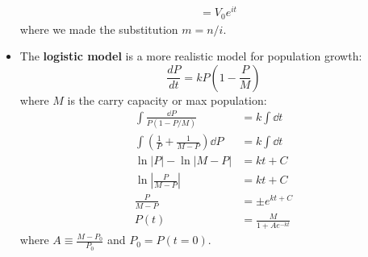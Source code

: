 \begin{itemize}
\begin{align}
        &= V_0e^{it}
    \end{align}
    where we made the substitution $m=n/i$.
    \item The \textbf{logistic model} is a more realistic model for population growth:
    \begin{equation}
        \frac{dP}{dt} = kP\left(1-\frac{P}{M}\right)
        \label{eq:}
    \end{equation}
    where $M$ is the carry capacity or max population:
    \begin{align}
        \int \frac{\dd{P}}{P(1-P/M)} &= k \int \dd{t} \\ 
        \int \left(\frac{1}{P}+\frac{1}{M-P}\right) \dd{P} &= k\int \dd{t} \\ 
        \ln|P|-\ln|M-P| &= kt + C \\ 
        \ln\left|\frac{P}{M-P}\right| &= kt + C \\ 
        \frac{P}{M-P} &= \pm e^{kt+C} \\
        P(t) &= \frac{M}{1+Ae^{-kt}}  
    \end{align}
    where $A \equiv \frac{M-P_0}{P_0}$ and $P_0 = P(t=0)$.
\end{itemize}